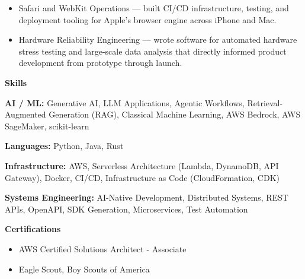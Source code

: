 \documentclass[10pt]{article}
\begin{document}
\begin{itemize}
\begin{itemize}
      \item Safari and WebKit Operations — built CI/CD infrastructure, testing, and deployment tooling for Apple's browser engine across iPhone and Mac.
      
      \item Hardware Reliability Engineering — wrote software for automated hardware stress testing and large-scale data analysis that directly informed product development from prototype through launch.
      
    \end{itemize}
    

  \end{itemize}

  \vspace{0.5em}
  {\large \textbf{Skills}}

  \begin{flushleft}
    \addtolength{\leftskip}{.3in}

    \textbf{AI / ML:} Generative AI, LLM Applications, Agentic Workflows, Retrieval-Augmented Generation (RAG), Classical Machine Learning, AWS Bedrock, AWS SageMaker, scikit-learn

    \vspace{0.3em}

    \textbf{Languages:} Python, Java, Rust

    \vspace{0.3em}

    \textbf{Infrastructure:} AWS, Serverless Architecture (Lambda, DynamoDB, API Gateway), Docker, CI/CD, Infrastructure as Code (CloudFormation, CDK)

    \vspace{0.3em}

    \textbf{Systems Engineering:} AI-Native Development, Distributed Systems, REST APIs, OpenAPI, SDK Generation, Microservices, Test Automation
  \end{flushleft}

  \vspace{0.5em}
  {\large \textbf{Certifications}}
  \begin{itemize}
      
      \item AWS Certified Solutions Architect - Associate
      
      \item Eagle Scout, Boy Scouts of America
      
  \end{itemize}
\end{document}

